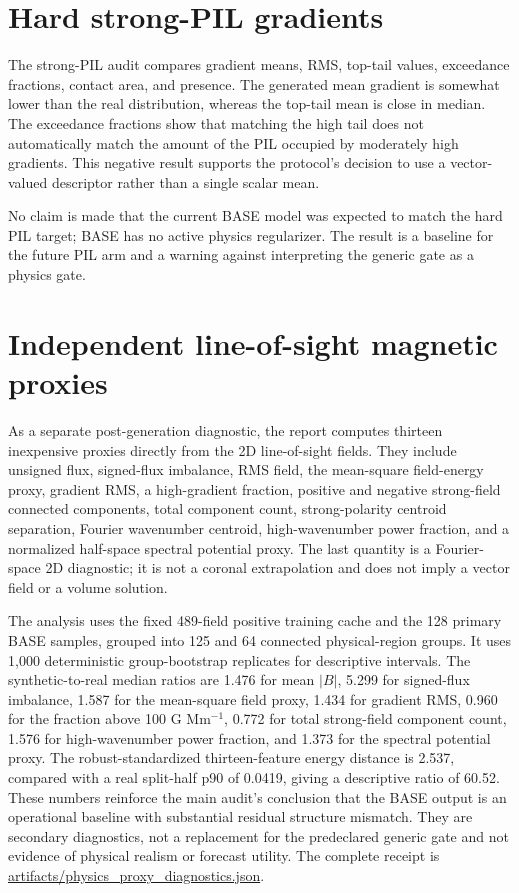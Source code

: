 \documentclass[11pt,oneside]{report}
\begin{document}
\section{Hard strong-PIL gradients}

The strong-PIL audit compares gradient means, RMS, top-tail values, exceedance fractions, contact area, and presence. The generated mean gradient is somewhat lower than the real distribution, whereas the top-tail mean is close in median. The exceedance fractions show that matching the high tail does not automatically match the amount of the PIL occupied by moderately high gradients. This negative result supports the protocol’s decision to use a vector-valued descriptor rather than a single scalar mean.

No claim is made that the current BASE model was expected to match the hard PIL target; BASE has no active physics regularizer. The result is a baseline for the future PIL arm and a warning against interpreting the generic gate as a physics gate.

\section{Independent line-of-sight magnetic proxies}

As a separate post-generation diagnostic, the report computes thirteen inexpensive proxies directly from the 2D line-of-sight fields. They include unsigned flux, signed-flux imbalance, RMS field, the mean-square field-energy proxy, gradient RMS, a high-gradient fraction, positive and negative strong-field connected components, total component count, strong-polarity centroid separation, Fourier wavenumber centroid, high-wavenumber power fraction, and a normalized half-space spectral potential proxy. The last quantity is a Fourier-space 2D diagnostic; it is not a coronal extrapolation and does not imply a vector field or a volume solution.

The analysis uses the fixed 489-field positive training cache and the 128 primary BASE samples, grouped into 125 and 64 connected physical-region groups. It uses 1,000 deterministic group-bootstrap replicates for descriptive intervals. The synthetic-to-real median ratios are 1.476 for mean $|B|$, 5.299 for signed-flux imbalance, 1.587 for the mean-square field proxy, 1.434 for gradient RMS, 0.960 for the fraction above 100 G Mm$^{-1}$, 0.772 for total strong-field component count, 1.576 for high-wavenumber power fraction, and 1.373 for the spectral potential proxy. The robust-standardized thirteen-feature energy distance is 2.537, compared with a real split-half p90 of 0.0419, giving a descriptive ratio of 60.52. These numbers reinforce the main audit’s conclusion that the BASE output is an operational baseline with substantial residual structure mismatch. They are secondary diagnostics, not a replacement for the predeclared generic gate and not evidence of physical realism or forecast utility. The complete receipt is \url{artifacts/physics_proxy_diagnostics.json}.
\end{document}
